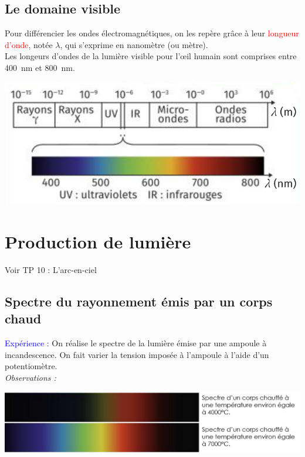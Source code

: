 \subsection{Le domaine visible}
\begin{tcolorbox}
[colback=green!5!white,colframe=green!75!black,title=\textbf{La longueur d'onde et le domaine du visible :}]
Pour différencier les ondes électromagnétiques, on les repère grâce à leur \textcolor{red}{longueur d'onde}, notée $\lambda$, qui s'exprime en nanomètre (ou mètre).\\
Les longeurs d'ondes de la lumière visible pour l'\oe il humain sont comprises entre 400~nm et 800~nm.
\begin{center}
    \includegraphics[scale=0.7]{Images/Longueur_onde.PNG}
\end{center}
\end{tcolorbox}

\section{Production de lumière}
\begin{Large}
\end{Large}
Voir TP 10 : L'arc-en-ciel
\subsection{Spectre du rayonnement émis par un corps chaud}
\textcolor{blue}{Expérience :} On réalise le spectre de la lumière émise par une ampoule à incandescence. On fait varier la tension imposée à l'ampoule à l'aide d'un potentiomètre. \\
\textit{Observations :} 

\begin{center}
    \includegraphics[scale=0.6]{Images/SpectresvsT_commente.png}
\end{center}

